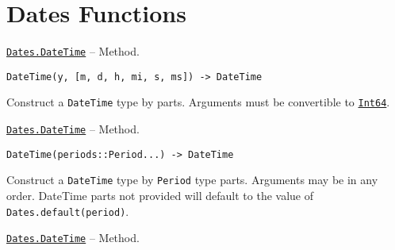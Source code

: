 \hypertarget{17975207601808486978}{}


\section{Dates Functions}


\hypertarget{1627558299938912801}{}
\hyperlink{1627558299938912801}{\texttt{Dates.DateTime}}  -- {Method.}

\begin{adjustwidth}{2em}{0pt}


\begin{verbatim}
DateTime(y, [m, d, h, mi, s, ms]) -> DateTime
\end{verbatim}

Construct a \texttt{DateTime} type by parts. Arguments must be convertible to \hyperlink{7720564657383125058}{\texttt{Int64}}.



\end{adjustwidth}
\hypertarget{8234829693150521940}{}
\hyperlink{8234829693150521940}{\texttt{Dates.DateTime}}  -- {Method.}

\begin{adjustwidth}{2em}{0pt}


\begin{verbatim}
DateTime(periods::Period...) -> DateTime
\end{verbatim}

Construct a \texttt{DateTime} type by \texttt{Period} type parts. Arguments may be in any order. DateTime parts not provided will default to the value of \texttt{Dates.default(period)}.



\end{adjustwidth}
\hypertarget{11116744915435665711}{}
\hyperlink{11116744915435665711}{\texttt{Dates.DateTime}}  -- {Method.}

